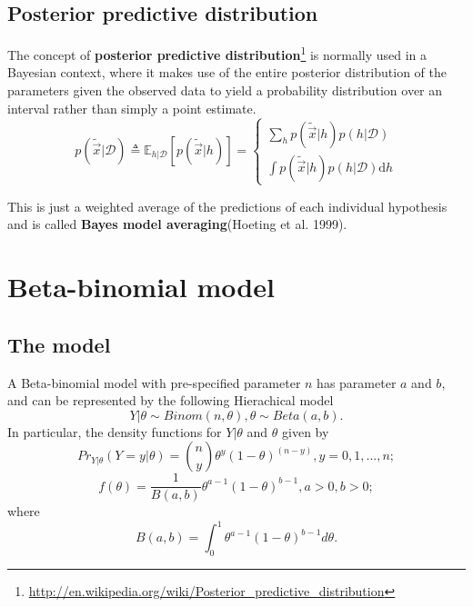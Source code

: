 \begin{refsection}
\subsection{Posterior predictive distribution}
The concept of \textbf{posterior predictive distribution}\footnote{\url{http://en.wikipedia.org/wiki/Posterior_predictive_distribution}} is normally used in a Bayesian context, where it makes use of the entire posterior distribution of the parameters given the observed data to yield a probability distribution over an interval rather than simply a point estimate. 
\begin{equation}
p(\tilde{\vec{x}}|\mathcal{D}) \triangleq \mathbb{E}_{h|\mathcal{D}}[p(\tilde{\vec{x}}|h)] = \begin{cases}
\sum_h p(\tilde{\vec{x}}|h)p(h|\mathcal{D}) \\
\int p(\tilde{\vec{x}}|h)p(h|\mathcal{D})\mathrm{d}h
\end{cases}
\end{equation}

This is just a weighted average of the predictions of each individual hypothesis and is called \textbf{Bayes model averaging}(Hoeting et al. 1999). 


\section{Beta-binomial model}

\subsection{The model}
\begin{definition}
A Beta-binomial model with pre-specified parameter $n$ has parameter $a$ and $b$, and can be represented by the following Hierachical model 
$$Y|\theta \sim Binom(n,\theta), \theta\sim Beta(a,b).$$
In particular, 
 the density functions for $Y|\theta$ and $\theta$ given by 
	$$Pr_{Y|\theta}(Y = y|\theta) = \binom{n}{y} \theta^y(1-\theta)^{(n-y)}, y=0,1,...,n;$$
	$$f(\theta) = \frac{1}{B(a,b)}\theta^{a-1}(1-\theta)^{b-1},a>0,b>0;$$
where $$B(a,b) = \int_0^1 \theta^{a-1}(1-\theta)^{b-1} d\theta.$$
\end{definition}




\end{refsection}
